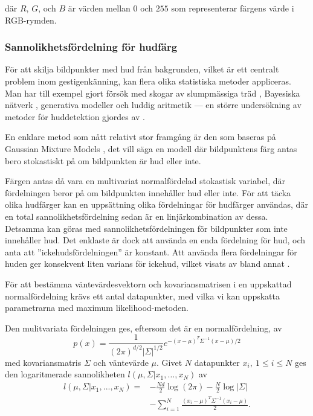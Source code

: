 \documentclass[../rapport_MVEX01-11-05]{subfiles}
\begin{document}
där $R$, $G$, och $B$ är värden mellan $0$ och $255$ som representerar
färgens värde i RGB-rymden.

\subsubsection{Sannolikhetsfördelning för hudfärg}

För att skilja bildpunkter med hud från bakgrunden, vilket är ett
centralt problem inom gestigenkänning, kan flera olika statistiska metoder
appliceras. Man har till exempel gjort försök med skogar av slumpmässiga träd
\cite{Khan10}, Bayesiska nätverk \cite{Sebe04}, generativa modeller \cite{Kruppa02}
och luddig aritmetik \cite{Shang10} --- en större undersökning av metoder
för huddetektion gjordes av .

En enklare metod som nått relativt stor framgång är den som baseras på
Gaussian Mixture Models \cite{Elmezain08,Hassanpour08}, det vill säga
en modell där bildpunktens färg antas bero stokastiskt på om bildpunkten
är hud eller inte.

Färgen antas då vara en multivariat normalfördelad
stokastisk variabel, där fördelningen beror på om bildpunkten innehåller hud
eller inte. För att täcka olika hudfärger kan en uppsättning olika
fördelningar för hudfärger användas, där en total
sannolikhetsfördelning sedan är en linjärkombination av dessa. Detsamma
kan göras med sannolikhetsfördelningen för bildpunkter som inte
innehåller hud. Det enklaste är dock att använda en enda fördelning för
hud, och anta att ''ickehudsfördelningen'' är konstant. Att använda flera
fördelningar för huden ger konsekvent liten varians för ickehud, vilket visats
av bland annat .

För att bestämma väntevärdesvektorn och kovariansmatrisen i en
uppskattad normalfördelning krävs ett
antal datapunkter, med vilka vi kan uppskatta parametrarna med maximum
likelihood-metoden.

Den mulitvariata fördelningen ges, eftersom det är en normalfördelning, av
\begin{equation*}
  p(x)=\frac{1}{(2\pi)^{d/2}|\Sigma|^{1/2}}e^{-(x-\mu)^T\Sigma^{-1}(x-\mu)/2}
\end{equation*}
med kovariansmatris $\Sigma$ och väntevärde $\mu$.
Givet $N$ datapunkter $x_i,\:1\leq i\leq N$ ges den logaritmerade
sannolikheten $l(\mu,\Sigma|x_1,{\ldots} ,x_N)$ av
\begin{equation*}
  \begin{aligned}
  l(\mu,\Sigma|x_1,...,x_N) = &-\frac{Nd}{2}\log(2\pi)-\frac{N}{2}\log|\Sigma|\\
                              &-\sum_{i=1}^N\frac{(x_i-\mu)^T\Sigma^{-1}(x_i-\mu)}{2}.
  \end{aligned}
\end{equation*}
\end{document}
